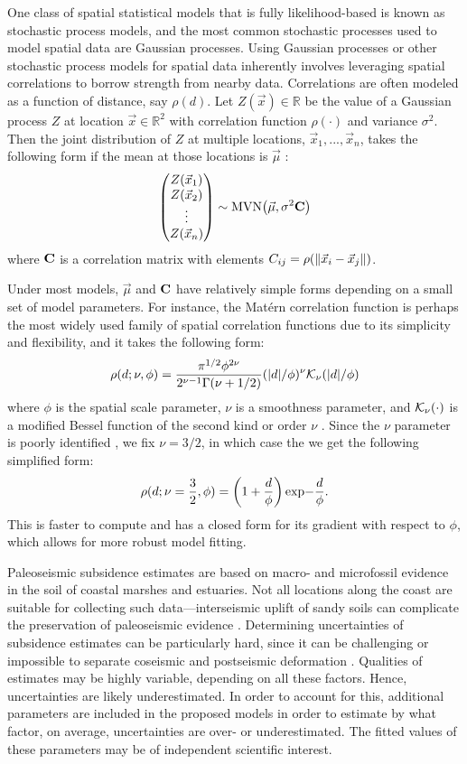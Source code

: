 {One class of spatial statistical models that is fully likelihood-based is known as stochastic process models, and the most common stochastic processes used to model spatial data are Gaussian processes.  Using Gaussian processes or other stochastic process models for spatial data inherently involves leveraging spatial correlations to borrow strength from nearby data.  Correlations are often modeled as a function of distance, say $\rho(d)$.  Let $Z(\vec{x}) \in \mathbb{R}$ be the value of a Gaussian process $Z$ at location $\vec{x} \in \mathbb{R}^2$ with correlation function $\rho(\cdot)$ and variance $\sigma^2$. Then the joint distribution of $Z$ at multiple locations, $\vec{x}_1, ..., \vec{x}_n$, takes the following form if the mean at those locations is $\vec{\mu}$ :
$$ \begin{pmatrix}
Z(\vec{x}_1) \\
Z(\vec{x}_2) \\
\vdots \\
Z(\vec{x}_n) \\
\end{pmatrix} \sim \text{MVN}\! \left( \vec{\mu}, \sigma^2 \mathbf{C} \right) $$
where $\mathbf{C}$ is a correlation matrix with elements $C_{ij} = \rho(\left \lVert \vec{x}_i - \vec{x}_j \right \rVert)$.

Under most models, $\vec{\mu}$ and $\mathbf{C}$ have relatively simple forms depending on a small set of model parameters.  For instance, the Mat\'{e}rn correlation function is perhaps the most widely used family of spatial correlation functions due to its simplicity and flexibility, and it takes the following form:
$$ \rho(d; \nu, \phi) = \frac{\pi^{1/2} \phi^{2\nu}}{2^{\nu - 1} \Gamma(\nu + 1/2)} (|d|/\phi)^{\nu} \mathcal{K}_\nu(|d|/\phi) $$
where $\phi$ is the spatial scale parameter, $\nu$ is a smoothness parameter, and $\mathcal{K}_\nu(\cdot)$ is a modified Bessel function of the second kind or order $\nu$ \citep[p.31]{steinBook}.  Since the $\nu$ parameter is poorly identified \citep[Ch. 1.3]{handbook}, we fix $\nu=3/2$, in which case the we get the following simplified form:
$$ \rho(d; \nu=\frac{3}{2}, \phi) = \left(1 + \frac{d}{\phi}\right) \text{exp}{-\frac{d}{\phi}}. $$
This is faster to compute and has a closed form for its gradient with respect to $\phi$, which allows for more robust model fitting.

Paleoseismic subsidence estimates are based on macro- and microfossil evidence in the soil of coastal marshes and estuaries.  Not all locations along the coast are suitable for collecting such data---interseismic uplift of sandy soils can complicate the preservation of paleoseismic evidence \citep{leonard2010}.  Determining uncertainties of subsidence estimates can be particularly hard, since it can be challenging or impossible to separate coseismic and postseismic deformation \citep{wang2012, wang2013}.  Qualities of estimates may be highly variable, depending on all these factors.  Hence, uncertainties are likely underestimated.  In order to account for this, additional parameters are included in the proposed models in order to estimate by what factor, on average, uncertainties are over- or underestimated.  The fitted values of these parameters may be of independent scientific interest.

}

